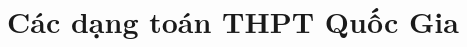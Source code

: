 
\usepackage{indentfirst}

	\renewcommand{\chaptername}{Chuyên đề} %
	\tableofcontents %
	\clearpage%
\chapter{Các dạng toán THPT Quốc Gia}
%	
	

